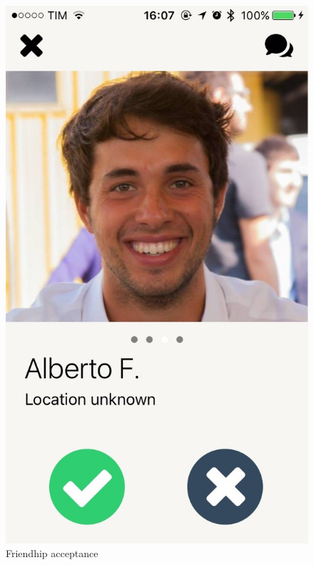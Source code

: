 \newpage

\begin{multicols}{2}
\begin{figure}[H]
\centering
\centering
\includegraphics[scale=0.15]{./images/friendship_acc.jpg}
\caption{\label{Expo Map}Friendhip acceptance}
\end{figure}


\end{multicols}
